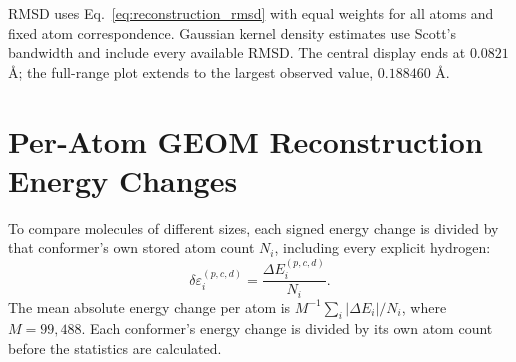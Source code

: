 \documentclass[%
 preprint,
superscriptaddress,
 amsmath,amssymb,
 aip,
 jcp,
]{revtex4-2}
\begin{document}
RMSD uses Eq.~\ref{eq:reconstruction_rmsd} with equal weights for all atoms and fixed atom correspondence.
Gaussian kernel density estimates use Scott's bandwidth and include every available RMSD.
The central display ends at $0.0821$ \AA; the full-range plot extends to the largest observed value, $0.188460$ \AA.


\section{Per-Atom GEOM Reconstruction Energy Changes}
\label{sec:geom_energy_per_atom}

To compare molecules of different sizes, each signed energy change is divided by that conformer's own stored atom count $N_i$, including every explicit hydrogen:
\begin{equation}
 \delta\varepsilon_i^{(p,c,d)}=\frac{\Delta E_i^{(p,c,d)}}{N_i}.
 \label{eq:geom_energy_per_atom}
\end{equation}
The mean absolute energy change per atom is $M^{-1}\sum_i|\Delta E_i|/N_i$, where $M=99{,}488$.
Each conformer's energy change is divided by its own atom count before the statistics are calculated.
\end{document}
